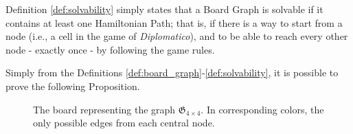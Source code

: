\documentclass[conference]{IEEEtran}
\begin{document}
Definition \ref{def:solvability} simply states that a Board Graph is solvable if it contains at least one Hamiltonian Path; that is, if there is a way to start from a node (i.e., a cell in the game of \textit{Diplomatico}), and to be able to reach every other node - exactly once - by following the game rules. 

Simply from the Definitions \ref{def:board_graph}-\ref{def:solvability}, it is possible to prove the following Proposition.

\begin{figure}[ht]
	\centering
	\caption{The board representing the graph $\mathfrak{G}_{4 \times 4}$. In corresponding colors, the only possible edges from each central node.}
	\label{fig:dim_unsolvability_4x4}
\end{figure}
\end{document}
